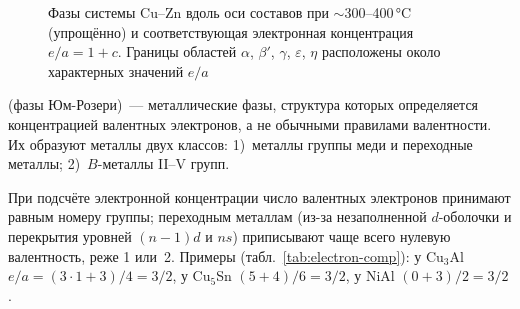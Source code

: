 \begin{figure}[ht]
\centering
{}
\caption{Фазы системы Cu--Zn вдоль оси составов при $\sim$300--400\,°C
(упрощённо) и соответствующая электронная концентрация $e/a=1+c$.
Границы областей $\alpha$, $\beta'$, $\gamma$, $\varepsilon$, $\eta$
расположены около характерных значений $e/a$}
\label{fig:CuZn}
\end{figure}

\begin{opredelenie}
 (фазы Юм-Розери)~— металлические фазы,
структура которых определяется концентрацией валентных электронов, а не
обычными правилами валентности. Их образуют металлы двух классов:
1)~металлы группы меди и переходные металлы; 2)~$B$-металлы II--V групп.
\end{opredelenie}

При подсчёте электронной концентрации число валентных электронов
принимают равным номеру группы; переходным металлам (из-за
незаполненной $d$-оболочки и перекрытия уровней $(n-1)d$ и $ns$)
приписывают чаще всего нулевую валентность, реже 1 или~2. Примеры
(табл.~\ref{tab:electron-comp}): у Cu$_3$Al $e/a=(3\cdot1+3)/4=3/2$, у
Cu$_5$Sn $(5+4)/6=3/2$, у NiAl $(0+3)/2=3/2$.

